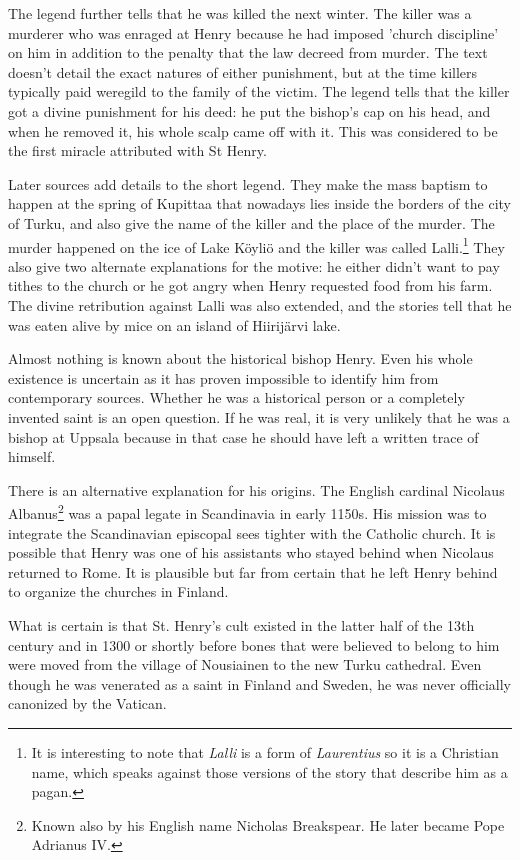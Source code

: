 \documentclass[a4paper, 12pt]{article}
\begin{document}
The legend further tells that he was killed the next winter. The
killer was a murderer who was enraged at Henry because he had imposed
'church discipline' on him in addition to the penalty that the law
decreed from murder. The text doesn't detail the exact natures of
either punishment, but at the time killers typically paid weregild to
the family of the victim. The legend tells that the killer got a
divine punishment for his deed: he put the bishop's cap on his head,
and when he removed it, his whole scalp came off with it. This was
considered to be the first miracle attributed with St Henry.

Later sources add details to the short legend. They make the mass
baptism to happen at the spring of Kupittaa that nowadays lies inside
the borders of the city of Turku, and also give the name of the killer
and the place of the murder. The murder happened on the ice of Lake
Köyliö and the killer was called Lalli.\footnote{It is interesting to
  note that \emph{Lalli} is a form of \emph{Laurentius} so it is a
  Christian name, which speaks against those versions of the story
  that describe him as a pagan.} They also give two alternate
explanations for the motive: he either didn't want to pay tithes to
the church or he got angry when Henry requested food from his farm.
The divine retribution against Lalli was also extended, and the
stories tell that he was eaten alive by mice on an island of
Hiirijärvi lake.

Almost nothing is known about the historical bishop Henry. Even his
whole existence is uncertain as it has proven impossible to identify
him from contemporary sources. Whether he was a historical person or a
completely invented saint is an open question. If he was real, it is
very unlikely that he was a bishop at Uppsala because in that case he
should have left a written trace of himself.

There is an alternative explanation for his origins. The English
cardinal Nicolaus Albanus\footnote{Known also by his English name
  Nicholas Breakspear. He later became Pope Adrianus IV.} was a papal
legate in Scandinavia in early 1150s. His mission was to integrate the
Scandinavian episcopal sees tighter with the Catholic church. It is
possible that Henry was one of his assistants who stayed behind when
Nicolaus returned to Rome. It is plausible but far from certain that
he left Henry behind to organize the churches in Finland.

What is certain is that St. Henry's cult existed in the latter half of
the 13th century and in 1300 or shortly before bones that were
believed to belong to him were moved from the village of Nousiainen to
the new Turku cathedral. Even though he was venerated as a saint in
Finland and Sweden, he was never officially canonized by the Vatican.
\end{document}
